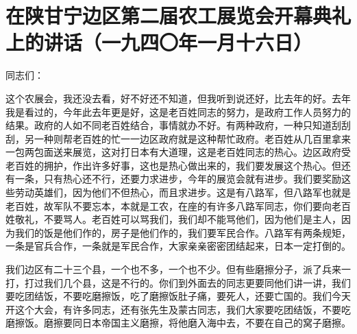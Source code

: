 \section[在陕甘宁边区第二届农工展览会开幕典礼上的讲话（一九四〇年一月十六日）]{在陕甘宁边区第二届农工展览会开幕典礼上的讲话（一九四〇年一月十六日）}


同志们：

这个农展会，我还没去看，好不好还不知道，但我听到说还好，比去年的好。去年我是看过的，今年此去年更是好，这是老百姓同志的努力，是政府工作人员努力的结果。政府的人如不同老百姓结合，事情就办不好。有两种政府，一种只知道刮刮刮，另一种则帮老百姓的忙一一边区政府就是这种帮忙政府。老百姓从几百里拿来一包两包面送来展览，这对打日本有大道理，这是老百姓同志的热心。边区政府受老百姓的拥护，作出许多好事，这也是热心做出来的，我们要发展这个热心。但还有一条，只有热心还不行，还要力求进步，今年的展览会就有进步。我们要奖励这些劳动英雄们，因为他们不但热心，而且求进步。这是有八路军，但八路军也就是老百姓，故军队不要忘本，本就是工农，在座的有许多八路军同志，你们要向老百姓敬礼，不要骂人。老百姓可以骂我们，我们却不能骂他们，因为他们是主人，因为我们的饭是他们作的，房子是他们作的，我们要军民合作。八路军有两条规矩，一条是官兵合作，一条就是军民合作，大家亲亲密密团结起来，日本一定打倒的。

我们边区有二十三个县，一个也不多，一个也不少。但有些磨擦分子，派了兵来一打，打过我们几个县，这是不行的。你们到外面去的同志更要同他们讲一讲，我们要吃团结饭，不要吃磨擦饭，吃了磨擦饭肚子痛，要死人，还要亡国的。我们今天开这个大会，有许多同志，还有张先生及蒙古同志，我们大家要吃团结饭，不要吃磨擦饭。磨擦要同日本帝国主义磨擦，将他磨入海中去，不要在自己的窝子磨擦。


